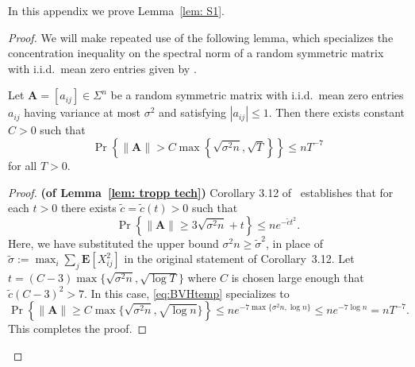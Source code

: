\documentclass[twoside,11pt]{article}
\newcommand{\E}{\mathbf{E}}
\DeclareMathOperator{\pr}{Pr}
\newcommand{\bs}{\boldsymbol}
\newcommand{\0}{\bs{0}}
\newcommand{\bra}[1]{\ensuremath{\left\{ #1 \right\}}} %
\begin{document}
In this appendix we prove Lemma~\ref{lem: S1}.
\begin{proof}
We will make repeated use of the following
lemma, which specializes the concentration inequality on the spectral norm
of a random symmetric matrix with i.i.d.~mean zero entries given by \citet[Corollary 3.12]{bandeira2016sharp}.

\begin{lemma} \label{lem: tropp tech}
	Let $\bs{A} = [a_{ij}] \in \Sigma^n$ be a random symmetric matrix with i.i.d.~mean zero entries $a_{ij}$ having variance at most
	$\sigma^2$ and satisfying $|a_{ij}| \leq 1$. Then there exists constant $C> 0$ such that
	\begin{equation} \label{eq:sparse_lemma}
	\pr \left\lbrace \|\bs{A}\| > C \max\left\lbrace \sqrt{ \sigma^2 n}, \sqrt{T} \right\rbrace \right\rbrace \leq nT^{-7}
	\end{equation}
	for all $T > 0$.
\end{lemma}

\begin{proof}
\newcommand{\ct}{\tilde c}
	{\bf (of Lemma~\ref{lem: tropp tech})}
	Corollary 3.12 of~\cite{bandeira2016sharp} establishes that for each $t>0$
	there exists $\tilde c = \tilde c(t) > 0$ such that
	\begin{equation} \label{eq:BVHtemp}
		\pr \bra{ \|\bs{A}\| \ge 3 \sqrt{\sigma^2 n} + t } \le n e^{-\ct t^2}.
	\end{equation}
	Here, we have substituted the upper bound $\sigma^2 n \ge \tilde \sigma^2$, in place of $\tilde \sigma:= \max_i \sum_{j} \E[X_{ij}^2]$ in the original statement of Corollary~3.12.
	Let $t = (C-3) \max\{ \sqrt{\sigma^2 n}, \sqrt{\log T} \}$ where $C$ is chosen large enough that $\ct 	(C-3)^2 > 7$.
	In this case, \eqref{eq:BVHtemp} specializes to
	\[
		\pr \bra{\|\bs{A}\| \ge C \max\{ \sqrt{\sigma^2 n}, \sqrt{\log n}\} }
		\le n e^{-7 \max\{\sigma^2 n, \log n\}} \le n e^{-7 \log n} = n T^{-7}.
	\]
	This completes the proof.
\end{proof}


\end{proof}
\end{document}
